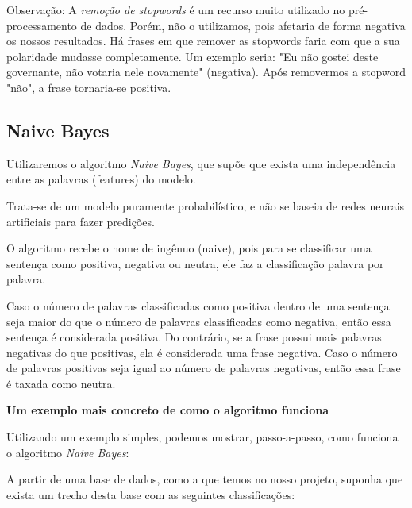 \documentclass[
article,			%
12pt,				%
a4paper,			%
english,			%
brazil,				%
sumario=tradicional,
twoside
]{abntex2}
\begin{document}
	Observação: A \emph{remoção de stopwords} é um recurso muito utilizado no 
	pré-processamento de dados. Porém, não o utilizamos, pois afetaria de forma negativa os nossos resultados. Há frases em que remover as stopwords faria com que a sua polaridade mudasse completamente. Um exemplo seria: "Eu não gostei deste governante, não votaria nele novamente" (negativa). Após removermos a stopword "não", a frase tornaria-se positiva.
	
	
	\label{naive}
	\subsection{Naive Bayes}
	Utilizaremos o algoritmo \emph{Naive Bayes}, que supõe que exista uma independência entre as palavras (features) do modelo. 
	
	Trata-se de um modelo puramente probabilístico, e não se baseia de redes neurais artificiais para fazer predições.
	
	O algoritmo recebe o nome de ingênuo (naive), pois para se classificar uma sentença como positiva, negativa ou neutra, ele faz a classificação palavra por palavra.
	
	 Caso o número de palavras classificadas como positiva dentro de uma sentença seja maior do que o número de palavras classificadas como negativa, então essa sentença é considerada positiva. Do contrário, se a frase possui mais palavras negativas do que positivas, ela é considerada uma frase negativa. Caso o número de palavras positivas seja igual ao número de palavras negativas, então essa frase é taxada como neutra.
	
	
	\textbf{Um exemplo mais concreto de como o algoritmo funciona}
	
	Utilizando um exemplo simples, podemos mostrar, passo-a-passo, como funciona o algoritmo \emph{Naive Bayes}:
	
	A partir de uma base de dados, como a que temos no nosso projeto, suponha que exista um trecho desta base com as seguintes classificações:
	
\end{document}

